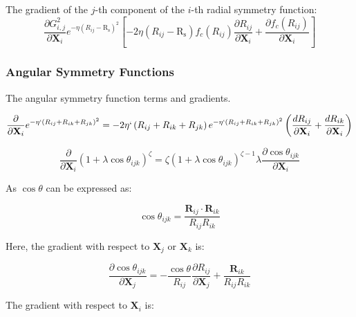 \documentclass{article}
\newcommand{\mb}[1]{\mathbf{#1}}
\begin{document}
The gradient of the $j$-th component of the $i$-th radial symmetry function:
\begin{equation}\label{eq:rad_derivative}
\frac{\partial G_{i,j}^2 } { \partial \mb{X}_i} e^{-\eta ( R_{ij} - \mathrm{R_s} )^2} \left[ -2 \eta ( R_{ij} - \mathrm{R_s} )  f_c (R_{ij}) \frac{\partial R_{ij}}{\partial  \mb{X}_i} + \frac{\partial f_c ( R_{ij} )}{\partial \mb{X}_i} \right] 
\end{equation}

\subsubsection{Angular Symmetry Functions}

The angular symmetry function terms and gradients.

\begin{equation}
\frac{\partial } {\partial \mb{X}_i}
 e^{-\eta ` \left( R_{ij} + R_{ik} + R_{jk} \right)^2 } =
  -2 \eta` \left( R_{ij} + R_{ik} + R_{jk} \right) e^{-\eta` \left( R_{ij} + R_{ik} + R_{jk} \right)^2   } \left(
\frac{d R_{ij}}{\partial \mb{X}_i} + \frac{d R_{ik}}{\partial \mb{X}_i} \right)
\end{equation}

\begin{equation}
\frac{\partial } {\partial \mb{X}_i} ( 1 + \lambda \cos{\theta_{ijk}} )^\zeta  = \zeta ( 1 + \lambda \cos \theta_{ijk} ) ^ {\zeta - 1} \lambda\frac{\partial \cos \theta_{ijk} } {\partial \mb{X}_i}
\end{equation}

As $\cos \theta$ can be expressed as:

\begin{equation}
\cos \theta_{ijk} = \frac{\mb{R}_{ij} \cdot  \mb{R}_{ik}} { R_{ij}  R_{ik}}
\end{equation}

Here, the gradient with respect to $\mb{X}_j$ or $\mb{X}_k$ is:

\begin{equation}
\frac{\partial \cos \theta_{ijk} } {\partial \mb{X}_j} = -\frac{\cos{\theta}}{R_{ij}} \frac{\partial R_{ij}}{\partial \mb{X}_j} + \frac{\mb{R}_{ik}}{R_{ij} R_{ik}}
\end{equation}

The gradient with respect to $\mb{X}_i$ is:
\end{document}
